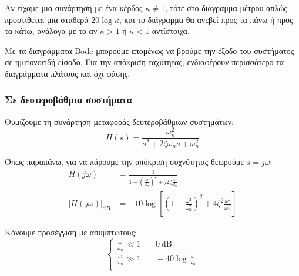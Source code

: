 \documentclass[11pt,a4paper,notitlepage,fleqn]{article}
\begin{document}
Αν είχαμε μια συνάρτηση με ένα κέρδος \( κ \neq 1 \), τότε στο διάγραμμα μέτρου απλώς
προστίθεται μια σταθερά \( 20\log κ \), και το διάγραμμα θα ανεβεί προς τα πάνω ή προς τα
κάτω, ανάλογα με το αν \( κ > 1 \) ή \( κ < 1 \) αντίστοιχα.

Με τα διαγράμματα Bode μπορούμε επομένως να βρούμε την έξοδο του συστήματος σε ημιτονοειδή
είσοδο. Για την απόκριση ταχύτητας, ενδιαφέρουν περισσότερο τα διαγράμματα πλάτους και όχι
φάσης.

\subsubsection{Σε δευτεροβάθμια συστήματα}
Θυμίζουμε τη συνάρτηση μεταφοράς δευτεροβάθμιων συστημάτων:
\[
H(s) = \frac{\omega_n^2}{s^2+2ζ\omega_n s + \omega_n^2}
\]

Όπως παραπάνω, για να πάρουμε την απόκριση συχνότητας θεωρούμε \( s = j\omega  \):
\begin{align*}
	H(j\omega )&= \frac{1}{1-\left(\frac{\omega }{\omega_n}\right)^2
		+j2ζ\frac{\omega}{\omega_n}} \\
	\left\lvert H(j\omega ) \right\rvert_{\mathrm dB}
	&= -10\log\left[
	\left(1-\frac{\omega^2}{\omega_n^2}\right)^2+4ζ^2\frac{\omega^2}{\omega_n^2}
	\right]
\end{align*}

Κάνουμε προσέγγιση με ασυμπτώτους:
\[
\begin{cases}
	\frac{\omega}{\omega_n} \ll 1 &\quad 0\ \mathrm{dB} \\
	\frac{\omega}{\omega_n} \gg 1 &\quad -40\log\frac{\omega}{\omega_n} \\
\end{cases}
\]

\end{document}
